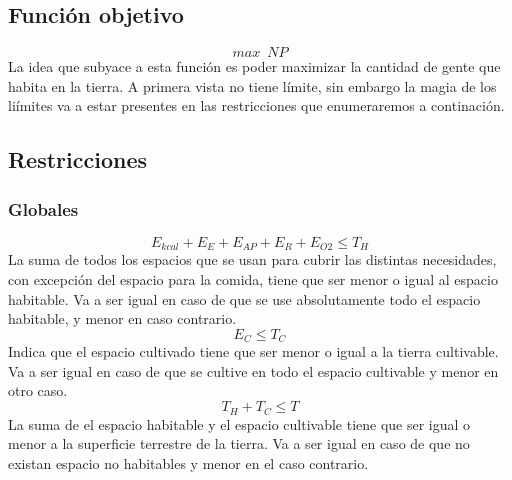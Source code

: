 \documentclass[12pt]{report}
\begin{document}
\subsection*{Funci\'on objetivo}

$$max \, \, \, NP$$
La idea que subyace a esta funci\'on es poder maximizar la cantidad de gente que habita en la tierra. A primera vista no tiene l\'imite, sin embargo la magia de los li\'imites va a estar presentes en las restricciones que enumeraremos a continaci\'on.  \\

\newpage
\subsection*{Restricciones}

\subsubsection*{Globales}
$$E_{kcal} + E_{E} + E_{AP} + E_{R} + E_{O2} \leq T_{H}$$
La suma de todos los espacios que se usan para cubrir las distintas necesidades, con excepci\'on del espacio para la comida, tiene que ser menor o igual al espacio habitable. Va a ser igual en caso de que se use absolutamente todo el espacio habitable, y menor en caso contrario.
\\
$$E_{C} \leq T_{C}$$
Indica que el espacio cultivado tiene que ser menor o igual a la tierra cultivable. Va a ser igual en caso de que se cultive en todo el espacio cultivable y menor en otro caso.
\\
$$T_{H} + T_{C} \leq T$$
La suma de el espacio habitable y el espacio cultivable tiene que ser igual o menor a la superficie terrestre de la tierra. Va a ser igual en caso de que no existan espacio no habitables y menor en el caso contrario.
\\
\end{document}
